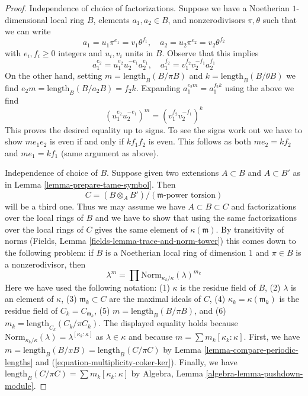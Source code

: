 \begin{proof}
Independence of choice of factorizations. Suppose we have
a Noetherian $1$-dimensional local ring $B$, elements $a_1, a_2 \in B$,
and nonzerodivisors $\pi, \theta$ such that we can write
$$
a_1 = u_1 \pi^{e_1} = v_1 \theta^{f_1},\quad
a_2 = u_2 \pi^{e_2} = v_2 \theta^{f_2}
$$
with $e_i, f_i \geq 0$ integers and $u_i, v_i$ units in $B$.
Observe that this implies
$$
a_1^{e_2} = u_1^{e_2}u_2^{-e_1}a_2^{e_1},\quad
a_1^{f_2} = v_1^{f_2}v_2^{-f_1}a_2^{f_1}
$$
On the other hand, setting
$m = \text{length}_B(B/\pi B)$ and $k = \text{length}_B(B/\theta B)$
we find $e_2 m = \text{length}_B(B/a_2 B) = f_2 k$.
Expanding $a_1^{e_2m} = a_1^{f_2 k}$ using the above we find
$$
(u_1^{e_2}u_2^{-e_1})^m =  (v_1^{f_2}v_2^{-f_1})^k
$$
This proves the desired equality up to signs. To see the signs
work out we have to show $me_1e_2$ is even if and only if
$kf_1f_2$ is even. This follows as both $me_2 = kf_2$ and
$me_1 = kf_1$ (same argument as above).

\medskip\noindent
Independence of choice of $B$. Suppose given two extensions
$A \subset B$ and $A \subset B'$ as in Lemma \ref{lemma-prepare-tame-symbol}.
Then
$$
C = (B \otimes_A B')/(\mathfrak m\text{-power torsion})
$$
will be a third one. Thus we may assume we have
$A \subset B \subset C$ and factorizations over the
local rings of $B$ and we have to show that using
the same factorizations over the local rings of $C$
gives the same element of $\kappa(\mathfrak m)$.
By transitivity of norms
(Fields, Lemma \ref{fields-lemma-trace-and-norm-tower})
this comes down to the following problem:
if $B$ is a Noetherian local ring of dimension $1$
and $\pi \in B$ is a nonzerodivisor, then
$$
\lambda^m = \prod \text{Norm}_{\kappa_k/\kappa}(\lambda)^{m_k}
$$
Here we have used the following notation:
(1) $\kappa$ is the residue field of $B$,
(2) $\lambda$ is an element of $\kappa$,
(3) $\mathfrak m_k \subset C$ are the maximal ideals of $C$,
(4) $\kappa_k = \kappa(\mathfrak m_k)$ is the residue field of
$C_k = C_{\mathfrak m_k}$,
(5) $m = \text{length}_B(B/\pi B)$, and
(6) $m_k = \text{length}_{C_k}(C_k/\pi C_k)$.
The displayed equality holds because
$\text{Norm}_{\kappa_k/\kappa}(\lambda) = \lambda^{[\kappa_k : \kappa]}$
as $\lambda \in \kappa$ and because $m = \sum m_k[\kappa_k:\kappa]$.
First, we have $m = \text{length}_B(B/xB) = \text{length}_B(C/\pi C)$
by Lemma \ref{lemma-compare-periodic-lengths} 
and (\ref{equation-multiplicity-coker-ker}).
Finally, we have $\text{length}_B(C/\pi C) = \sum m_k[\kappa_k:\kappa]$
by Algebra, Lemma \ref{algebra-lemma-pushdown-module}.
\end{proof}

